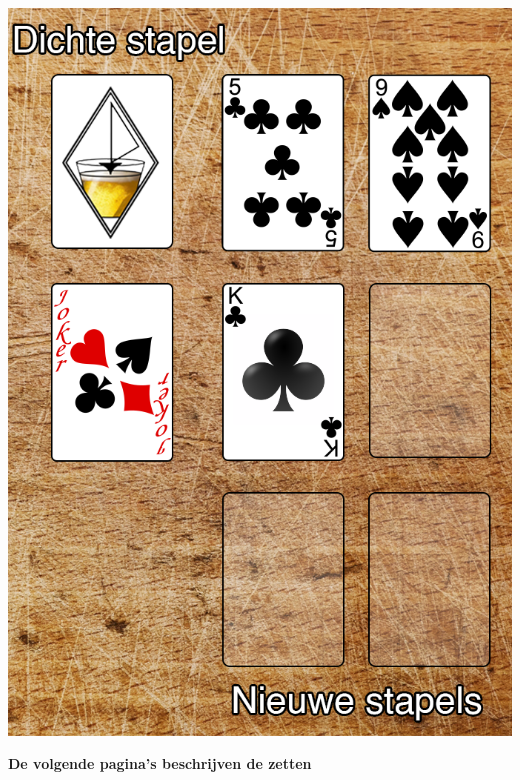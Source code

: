 \begin{minipage}[t]{.48\textwidth}
\includegraphics[width=1\textwidth]{img/FritsPlank_Stapels_v2.png}
\end{minipage}
\vspace{0.53cm}

\centerline{\Large{\textbf{De volgende pagina's beschrijven de zetten}}}